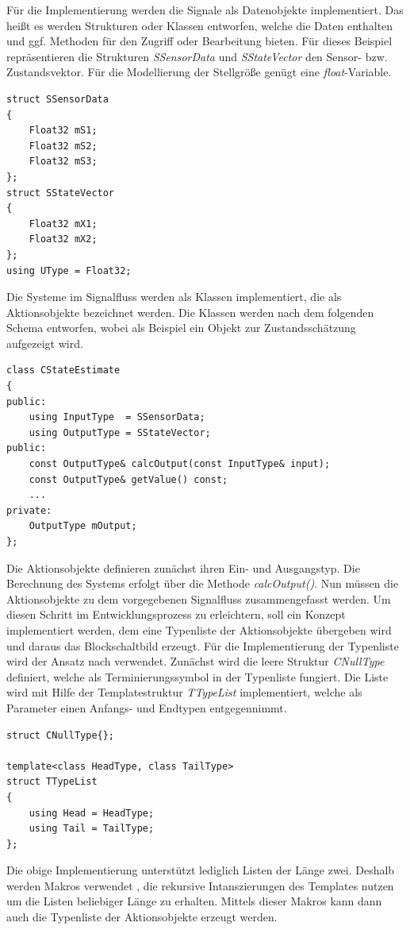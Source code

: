 Für die Implementierung werden die Signale als Datenobjekte implementiert. Das heißt es werden Strukturen oder Klassen entworfen, welche die Daten enthalten und ggf. Methoden für den Zugriff oder Bearbeitung bieten. Für dieses Beispiel repräsentieren die Strukturen \textit{SSensorData} und \textit{SStateVector} den Sensor- bzw. Zustandsvektor. Für die Modellierung der Stellgröße genügt eine \textit{float}-Variable.
\begin{lstlisting}[caption={Beispielhafte Implementierung eines Datenobjektes},captionpos=b]
struct SSensorData
{
	Float32 mS1;
	Float32 mS2;
	Float32 mS3;
};
struct SStateVector
{
	Float32 mX1;
	Float32 mX2;
};
using UType = Float32;
\end{lstlisting}
Die Systeme im Signalfluss werden als Klassen implementiert, die als Aktionsobjekte bezeichnet werden. Die Klassen werden nach dem folgenden Schema entworfen, wobei als Beispiel ein Objekt zur Zustandsschätzung aufgezeigt wird.
\begin{lstlisting}[caption={Beispielhafte Implementierung eines Aktionsobjektes},captionpos=b]
class CStateEstimate
{
public:
	using InputType	 = SSensorData;
	using OutputType = SStateVector;
public:
	const OutputType& calcOutput(const InputType& input);
	const OutputType& getValue() const;
	...
private:	 
	OutputType mOutput;
};
\end{lstlisting}
Die Aktionsobjekte definieren zunächst ihren Ein- und Ausgangstyp. Die Berechnung des Systems erfolgt über die Methode \textit{calcOutput()}.
Nun müssen die Aktionsobjekte zu dem vorgegebenen Signalfluss zusammengefasst werden. Um diesen Schritt im Entwicklungsprozess zu erleichtern, soll ein Konzept implementiert werden, dem eine Typenliste der Aktionsobjekte übergeben wird und daraus das Blockschaltbild erzeugt.
Für die Implementierung der Typenliste wird der Ansatz nach \cite[S. 40 ff.]{ModernCpp} verwendet. Zunächst wird die leere Struktur \textit{CNullType} definiert, welche als Terminierungssymbol in der Typenliste fungiert. Die Liste wird mit Hilfe der Templatestruktur \textit{TTypeList} implementiert, welche als Parameter einen Anfangs- und Endtypen entgegennimmt.
\begin{lstlisting}[caption={Implementierung der Typenlist},captionpos=b]
struct CNullType{};

template<class HeadType, class TailType>
struct TTypeList
{
	using Head = HeadType;
	using Tail = TailType;
};
\end{lstlisting}
Die obige Implementierung unterstützt lediglich Listen der Länge zwei. Deshalb werden Makros verwendet \cite[S. 45]{ModernCpp}, die rekursive Intanszierungen des Templates nutzen um die Listen beliebiger Länge zu erhalten. Mittels dieser Makros kann dann auch die Typenliste der Aktionsobjekte erzeugt werden.

